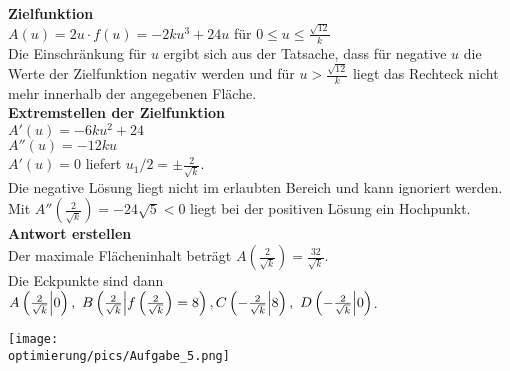 \begin{Answer}[ref=optimierungA5]\\
	\begin{minipage}{\textwidth}
		\begin{minipage}{.5\textwidth}\raggedright
			\textbf{Zielfunktion}\\
			\(A(u)=2u\cdot f(u)=-2ku^3+24u\) für \(0\leq u\leq \frac{\sqrt{12}}{k}\)\\
			Die Einschränkung für \(u\) ergibt sich aus der Tatsache, dass für negative \(u\) die Werte der Zielfunktion negativ werden und für \(u>\frac{\sqrt{12}}{k}\) liegt das Rechteck nicht mehr innerhalb der angegebenen Fläche.\\
			\textbf{Extremstellen der Zielfunktion}\\
			\(A'(u)=-6ku^2+24\)\\
			\(A''(u)=-12ku\)\\
			\(A'(u)=0\) liefert \(u_1/2=\pm\frac{2}{\sqrt{k}}\).\\
			Die negative Lösung liegt nicht im erlaubten Bereich und kann ignoriert werden.\\
			Mit \(A''\left(\frac{2}{\sqrt{k}}\right)=-24\sqrt{5}<0\) liegt bei der positiven Lösung ein Hochpunkt.\\
			\textbf{Antwort erstellen}\\
			Der maximale Flächeninhalt beträgt \(A\left(\frac{2}{\sqrt{k}}\right)=\frac{32}{\sqrt{k}}\).\\
			Die Eckpunkte sind dann 
			\(A\left( \frac{2}{\sqrt{k}}\middle\vert 0\right),
			\ B\left( \frac{2}{\sqrt{k}}\middle\vert f\left(\frac{2}{\sqrt{k}}\right)=8\right),\newline
			C\left(-\frac{2}{\sqrt{k}}\middle\vert 8\right),
			\ D\left(-\frac{2}{\sqrt{k}}\middle\vert 0\right)\).
		\end{minipage}
		\begin{minipage}{.5\textwidth}
			\texttt{[image: \\optimierung/pics/Aufgabe\_5.png]}
		\end{minipage}
	\end{minipage}
\end{Answer}